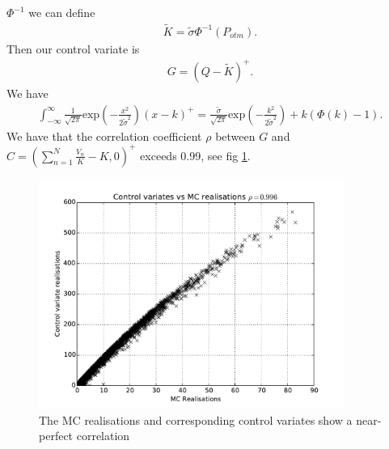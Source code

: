 \documentclass[a4paper,11pt]{article}
\newcommand{\expf}[1]{\mathrm{exp}\left ( {#1}\right )}
\newcommand{\parent}[1]{\left( {#1} \right)}
\newcommand{\ssum}[2]{\displaystyle\sum\limits_{#1}^{#2}}
\begin{document}
$\Phi^{-1}$ we can define
\begin{align}
\tilde K = \tilde \sigma \Phi^{-1} \parent{P_{otm}}.
\end{align}
Then our control variate is
\begin{align}
G=\parent{Q-\tilde K}^+.
\end{align}
We have
\begin{align}
\int_{-\infty}^{\infty} \frac{1}{\sqrt{2 \pi}} \expf{-\frac{x^2}{2 \tilde \sigma^2}} \parent{x-k}^+
 =
 \frac{\tilde \sigma}{\sqrt{2 \pi}}
 \expf{-\frac{k^2}{2 \tilde \sigma^2}}
 +k \parent{\Phi \parent{k} -1}.
\end{align}
We have that the correlation coefficient $\rho$ between 
$G$ and $C = \parent{\ssum{n=1}{N}\frac{V_n}{K}-K,0}^+$
exceeds 0.99, see fig \ref{cvfig}.
\begin{figure}
\begin{center}
\includegraphics[width=100mm]{./cvplot.pdf}
\end{center}
\caption{
\label{cvfig}
The MC realisations and corresponding
control variates show a near-perfect correlation
}
\end{figure}
\end{document}
